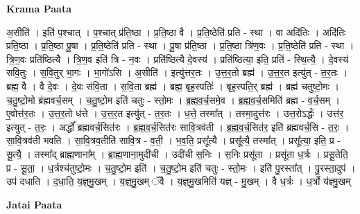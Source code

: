 \documentclass[17pt]{extarticle}
\begin{document}
\textbf{Krama Paata} \newline

अ॒सीति॑ । इति॑ प॒श्चात् । प॒श्चात् प्र॑ति॒ष्ठा । प्र॒ति॒ष्ठा वै । प्र॒ति॒ष्ठेति॑ प्रति - स्था । वा अदि॑तिः । अदि॑तिः प्रति॒ष्ठा । प्र॒ति॒ष्ठा पू॒षा । प्र॒ति॒ष्ठेति॑ प्रति - स्था । पू॒षा प्र॑ति॒ष्ठा । प्र॒ति॒ष्ठा त्रि॑ण॒वः । प्र॒ति॒ष्ठेति॑ प्रति - स्था । त्रि॒ण॒वः प्रति॑ष्ठित्यै । त्रि॒ण॒व इति॑ त्रि - न॒वः । प्रति॑ष्ठित्यै दे॒वस्य॑ । प्रति॑ष्ठित्या॒ इति॒ प्रति॑ - स्थि॒त्यै॒ । दे॒वस्य॑ सवि॒तुः । स॒वि॒तुर् भा॒गः । भा॒गो॑ऽसि । अ॒सीति॑ । इत्यु॑त्तर॒तः । उ॒त्त॒र॒तो ब्रह्म॑ । उ॒त्त॒र॒त इत्यु॑त् - त॒र॒तः । ब्रह्म॒ वै । वै दे॒वः । दे॒वः स॑वि॒ता । स॒वि॒ता ब्रह्म॑ । ब्रह्म॒ बृह॒स्पतिः॑ । बृह॒स्पति॒र् ब्रह्म॑ । ब्रह्म॑ चतुष्टो॒मः । च॒तु॒ष्टो॒मो ब्र॑ह्मवर्च॒सम् । च॒तु॒ष्टो॒म इति॑ चतुः - स्तो॒मः । ब्र॒ह्म॒व॒र्च॒समे॒व । ब्र॒ह्म॒व॒र्च॒समिति॑ ब्रह्म - व॒र्च॒सम् । ए॒वोत्त॑र॒तः । उ॒त्त॒र॒तो ध॑त्ते । उ॒त्त॒र॒त इत्यु॑त् - त॒र॒तः । ध॒त्ते॒ तस्मा᳚त् । तस्मा॒दुत्त॑रः । उत्त॒रोऽर्द्धः॑ । उत्त॑र॒ इत्युत् - त॒रः॒ । अर्द्धो᳚ ब्रह्मवर्च॒सित॑रः । ब्र॒ह्म॒व॒र्च॒सित॑रः सावि॒त्रव॑ती । ब्र॒ह्म॒व॒र्च॒सित॑र॒ इति॑ ब्रह्मवर्च॒सि - त॒रः॒ । सा॒वि॒त्रव॑ती भवति । सा॒वि॒त्रव॒तीति॑ सावि॒त्र - व॒ती॒ । भ॒व॒ति॒ प्रसू᳚त्यै । प्रसू᳚त्यै॒ तस्मा᳚त् । प्रसू᳚त्या॒ इति॒ प्र - सू॒त्यै॒ । तस्मा᳚द् ब्राह्म॒णाना᳚म् । ब्रा॒ह्म॒णाना॒मुदी॑ची । उदी॑ची स॒निः । स॒निः प्रसू॑ता । प्रसू॑ता ध॒र्त्रः । प्रसू॒तेति॒ प्र - सू॒ता॒ । ध॒र्त्रश्च॑तुष्टो॒मः । च॒तु॒ष्टो॒म इति॑ । च॒तु॒ष्टो॒म इति॑ चतुः - स्तो॒मः । इति॑ पु॒रस्ता᳚त् । पु॒रस्ता॒दुप॑ । उप॑ दधाति । द॒धा॒ति॒ य॒ज्ञ्॒मु॒खम् । य॒ज्ञ्॒मु॒खम् ॅवै । य॒ज्ञ्॒मु॒खमिति॑ यज्ञ् - मु॒खम् । वै ध॒र्त्रः । ध॒र्त्रो य॑ज्ञ्मु॒खम् \newline

\textbf{Jatai Paata} \newline
\end{document}
